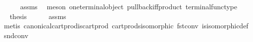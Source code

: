 \begin{isabellebody}
\ \ \ \ \isamarkupfalse%
\ assms\ \isamarkupfalse%
\ {\isacharparenleft}{\kern0pt}meson\ one{\isacharunderscore}{\kern0pt}terminal{\isacharunderscore}{\kern0pt}object\ pullback{\isacharunderscore}{\kern0pt}iff{\isacharunderscore}{\kern0pt}product\ terminal{\isacharunderscore}{\kern0pt}func{\isacharunderscore}{\kern0pt}type{\isacharparenright}{\kern0pt}\isanewline
\ \ \isamarkupfalse%
\ \isamarkupfalse%
\ {\isacharquery}{\kern0pt}thesis\isanewline
\ \ \ \ \isamarkupfalse%
\ assms\ \isamarkupfalse%
\ {\isacharparenleft}{\kern0pt}metis\ canonical{\isacharunderscore}{\kern0pt}cart{\isacharunderscore}{\kern0pt}prod{\isacharunderscore}{\kern0pt}is{\isacharunderscore}{\kern0pt}cart{\isacharunderscore}{\kern0pt}prod\ cart{\isacharunderscore}{\kern0pt}prods{\isacharunderscore}{\kern0pt}isomorphic\ fst{\isacharunderscore}{\kern0pt}conv\ is{\isacharunderscore}{\kern0pt}isomorphic{\isacharunderscore}{\kern0pt}def\ snd{\isacharunderscore}{\kern0pt}conv{\isacharparenright}{\kern0pt}\isanewline
{}\isamarkupfalse%
%
\endisatagproof
{\isafoldproof}%
%
\isadelimproof
\isanewline
%
\endisadelimproof
%
\isadelimtheory
\isanewline
%
\endisadelimtheory
%
\isatagtheory
{}\isamarkupfalse%
%
\endisatagtheory
{\isafoldtheory}%
%
\isadelimtheory
%
\endisadelimtheory
%
\end{isabellebody}%
\endinput
